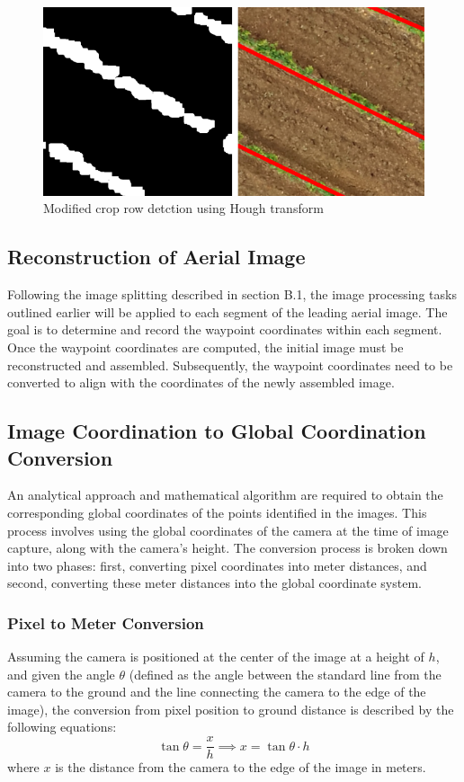 \documentclass[conference]{IEEEtran}
\begin{document}
\begin{figure}[htbp]
\includegraphics[width=\linewidth]{Hough Revised2.png}
\caption{Modified crop row detction using Hough transform}
\label{fig4}
\end{figure}


\subsection{Reconstruction of Aerial Image}
Following the image splitting described in section B.1, the image processing tasks outlined earlier will be applied to each segment of the leading aerial image. The goal is to determine and record the waypoint coordinates within each segment. Once the waypoint coordinates are computed, the initial image must be reconstructed and assembled. Subsequently, the waypoint coordinates need to be converted to align with the coordinates of the newly assembled image.

\subsection{Image Coordination to Global Coordination Conversion}
An analytical approach and mathematical algorithm are required to obtain the corresponding global coordinates of the points identified in the images. This process involves using the global coordinates of the camera at the time of image capture, along with the camera's height. The conversion process is broken down into two phases: first, converting pixel coordinates into meter distances, and second, converting these meter distances into the global coordinate system.

\subsubsection{Pixel to Meter Conversion}
Assuming the camera is positioned at the center of the image at a height of \( h \), and given the angle \( \theta \) (defined as the angle between the standard line from the camera to the ground and the line connecting the camera to the edge of the image), the conversion from pixel position to ground distance is described by the following equations:
\[
\tan \theta = \frac{x}{h} \implies x = \tan \theta  \cdot h
\]
where \( x \) is the distance from the camera to the edge of the image in meters.
\end{document}
